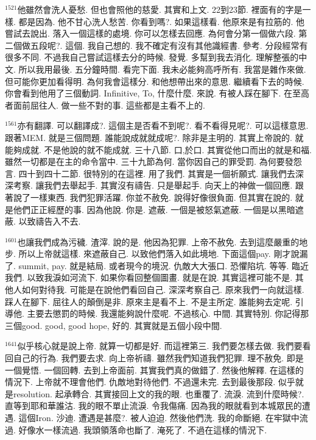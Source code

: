 \documentclass{book}
\begin{document}
$^{1521}$他雖然會洗人憂愁.
但也會照他的慈愛.
其實和上文.
22到23節.
裡面有的字是一樣.
都是因為.
他不甘心洗人愁苦.
你看到嗎?.
如果這樣看.
他原來是有拉筋的.
他嘗試去說出.
落入一個這樣的處境.
你可以怎樣去回應.
為何會分第一個做六段.
第二個做五段呢?.
這個.
我自己想的.
我不確定有沒有其他識經書.
參考.
分段經常有很多不同.
不過我自己嘗試這樣去分的時候.
發覺.
多幫到我去消化.
理解整張的中文.
所以我用最後.
五分鐘時間.
看完下面.
我未必能夠高呼所有.
我當是雜作來做.
但可能你更加看得明.
為何我會這樣分.
和他想帶出來的意思.
繼續看下去的時候.
你會看到他用了三個動詞.
Infinitive, To, 什麼什麼.
來說.
有被人踩在腳下.
在至高者面前屈往人.
做一些不對的事.
這些都是主看不上的.

$^{1561}$亦有翻譯.
可以翻譯成?.
這個主是否看不到呢?.
看不看得見呢?.
可以這樣意思.
跟著MEM.
就是三個問題.
誰能說成就就成呢?.
除非是主明的.
其實上帝說的.
就能夠成就.
不是他說的就不能成就.
三十八節.
口,於口.
其實從他口而出的就是和福.
雖然一切都是在主的命令當中.
三十九節為何.
當你因自己的罪受罰.
為何要發怨言.
四十到四十二節.
很特別的在這裡.
用了我們.
其實是一個祈願式.
讓我們去深深考察.
讓我們去舉起手.
其實沒有禱告.
只是舉起手.
向天上的神做一個回應.
跟著說了一樣東西.
我們犯罪活躍.
你並不赦免.
說得好像很負面.
但其實在說的.
就是他們正正經歷的事.
因為他說.
你是.
遮蔽.
一個是被怒氣遮蔽.
一個是以黑暗遮蔽.
以致禱告入不去.

$^{1601}$也讓我們成為污穢.
渣滓.
說的是.
他因為犯罪.
上帝不赦免.
去到這麼嚴重的地步.
所以上帝就這樣.
來遮蔽自己.
以致他們落入如此境地.
下面這個pay.
剛才說漏了.
summit, pay.
就是結局.
或者現今的境況.
仇敵大大張口.
恐懼陷坑.
等等.
臨近我們.
以致我淚如河流下.
如果你看回整個圖畫.
就是在說.
其實這裡可能不是.
其他人如何對待我.
可能是在說他們看回自己.
深深考察自己.
原來我們一向就這樣.
踩人在腳下.
屈往人的顛倒是非.
原來主是看不上.
不是主所定.
誰能夠去定呢.
引導他.
主要去懲罰的時候.
我還能夠說什麼呢.
不過核心.
中間.
其實特別.
你記得那三個good.
good, good hope, 好的.
其實就是五個小段中間.

$^{1641}$似乎核心就是說上帝.
就算一切都是好.
而這裡第三.
我們要怎樣去做.
我們要看回自己的行為.
我們要去求.
向上帝祈禱.
雖然我們知道我們犯罪.
理不赦免.
即是一個覺悟.
一個回轉.
去到上帝面前.
其實我們真的做錯了.
然後他解釋.
在這樣的情況下.
上帝就不理會他們.
仇敵地對待他們.
不過還未完.
去到最後那段.
似乎就是resolution.
起承轉合.
其實接回上文的我的眼.
也重覆了.
流淚.
流到什麼時候?.
直等到耶和華誰沽.
我的眼不單止流淚.
令我傷痛.
因為我的眼就看到本城眾民的遭遇.
這個Iron.
沙迪.
遭遇是甚麼?.
被人迫迫.
然後他們洗.
我的命斷絕.
在牢獄中流過.
好像水一樣流過.
我頭領落命也斷了.
淹死了.
不過在這樣的情況下.
\end{document}
